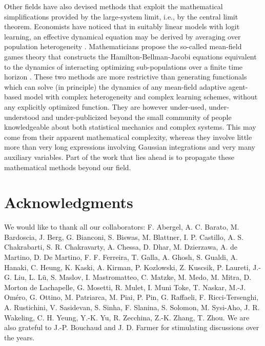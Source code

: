 \documentclass[aps,twocolumn,nofootinbib,sortedaddress,reprint]{revtex4-1}
\begin{document}
Other fields have also devised methods that exploit the mathematical simplifications
provided by the large-system limit, i.e., by the central limit theorem. Economists have noticed that in suitably
linear models with logit learning, an effective dynamical equation may
be derived by averaging over population heterogeneity
\cite{brock2001largetypelimit}. Mathematicians propose the so-called
mean-field games theory that constructs the Hamilton-Bellman-Jacobi
equations equivalent to the dynamics of interacting optimizing
sub-populations over a finite time horizon
\cite{lasry2007meanfieldgames}. These two methods are more restrictive than
generating functionals which can solve (in principle) the dynamics of
any mean-field adaptive agent-based model with complex heterogeneity
and complex learning schemes, without any explicitly optimized
function. They are however under-used, under-understood and
under-publicized beyond the small community of people knowledgeable
about both statistical mechanics and complex systems. This may come
from their apparent mathematical complexity, whereas they involve
little more than very long expressions involving Gaussian integrations
and very many auxiliary variables. Part of the work that lies ahead
is to propagate these mathematical methods beyond our field.




\section*{Acknowledgments}

We would like to thank all our collaborators:
F. Abergel,
A. C. Barato,
M. Bardoscia,
J. Berg,
G. Bianconi,
S. Biswas,
M. Blattner,
I. P. Castillo,
A. S. Chakrabarti,
S. R. Chakravarty,
A. Chessa,
D. Dhar,
M. Dzierzawa,
A. de Martino,
D. De Martino,
F. F. Ferreira,
T. Galla,
A. Ghosh,
S. Gualdi,
A. Hanaki,
C. Heung,
K. Kaski,
A. Kirman,
P. Kozlowski,
Z. Kuscsik,
P. Laureti,
J.-G. Liu,
L. L\"u,
S. Maslov,
I. Mastromatteo,
C. Matzke,
M. Medo,
M. Mitra,
D. Morton de Lachapelle,
G. Mosetti,
R. Mulet,
I. Muni Toke,
T. Naskar,
M.-J. Om\'ero,
G. Ottino,
M. Patriarca,
M. Piai,
P. Pin,
G. Raffaeli,
F. Ricci-Tersenghi,
A. Rustichini,
V. Sasidevan,
S. Sinha,
F. Slanina,
S. Solomon,
M. Sysi-Aho,
J. R. Wakeling,
C. H. Yeung,
Y.-K. Yu,
R. Zecchina,
Z.-K. Zhang,
T. Zhou.
We are also grateful to J.-P. Bouchaud and J. D. Farmer for stimulating discussions over the years.

 
\end{document}
